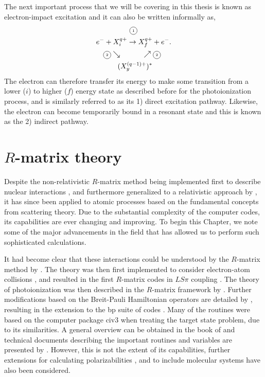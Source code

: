 The next important process that we will be covering in this thesis is known as electron-impact excitation and it can also be written informally as,
\begin{equation}\label{eq:rmat_basicelectron}
\begin{split}
& ~~~~~~~~~~~~~~ \tiny{\circled{1}}\\
& e^- + X_i^{q+} \rightarrow X_f^{q+} + e^-.\\
& ~~~\tiny{\circled{2}}\searrow ~~~~~~~~~~~~~~\nearrow \tiny{\circled{2}} \\
& ~~~~~~~~~(X_y^{(q-1)+})^*
\end{split}
\end{equation}
The electron can therefore transfer its energy to make some transition from a lower ($i$) to higher ($f$) energy state as described before for the photoionization process, and is similarly referred to as its 1) direct excitation pathway. Likewise, the electron can become temporarily bound in a resonant state and this is known as the 2) indirect pathway.


\section{$R$-matrix theory}\label{sec:rmatrix}
Despite the non-relativistic $R$-matrix method being implemented first to describe nuclear interactions \citep{1947PhRv...72...29W}, and furthermore generalized to a relativistic approach by \citet{1948PhRv...73.1463G}, it has since been applied to atomic processes based on the fundamental concepts from scattering theory. Due to the substantial complexity of the computer codes, its capabilities are ever changing and improving. To begin this Chapter, we note some of the major advancements in the field that has allowed us to perform such sophisticated calculations. 

It had become clear that these interactions could be understood by the $R$-matrix method by \citet{1968AdAMP...4..173B}. The theory was then first implemented to consider electron-atom collisions \citep{1971JPhB....4..153B}, and resulted in the first $R$-matrix codes in $LS\pi$ coupling \cite{1974CoPhC...8..149B}. The theory of photoionization was then described in the $R$-matrix framework by \citet{1975JPhB....8.2620B}. Further modifications based on the Breit-Pauli Hamiltonian operators are detailed by \citet{1980JPhB...13.4299S}, resulting in the extension to the {\sc bp} suite of codes \citep{1982CoPhC..25..347S, 2001JPhB...34.4455M}. Many of the routines were based on the computer package {\sc civ3} when treating the target state problem, due to its similarities. A general overview can be obtained in the book of \citet{2011rmta.book.....B} and technical documents describing the important routines and variables are presented by \citet{1995CoPhC..92..290B}. However, this is not the extent of its capabilities, further extensions for calculating polarizabilities \citep{1973JPhB....6..945R}, and to include molecular systems \citep{1977JPhB...10.2497B} have also been considered.

